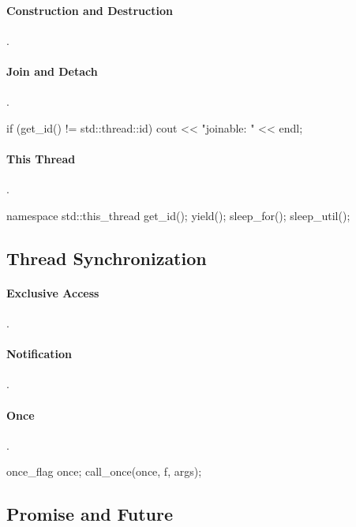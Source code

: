 \paragraph{Construction and Destruction}{.}
\begin{code}
\end{code}

\paragraph{Join and Detach}{.}
\begin{code}
if (get_id() != std::thread::id{}) {
  cout << "joinable: " << endl;
}
\end{code}

\paragraph{This Thread}{.}
\begin{code}
namespace std::this_thread
{
  get_id(); yield(); sleep_for(); sleep_util();
}
\end{code}

\subsection*{Thread Synchronization}
\paragraph{Exclusive Access}{.}
\begin{code}
\end{code}

\paragraph{Notification}{.}
\begin{code}
\end{code}

\paragraph{Once}{.}
\begin{code}
once_flag once{}; call_once(once, f, args);
\end{code}

\subsection*{Promise and Future}
